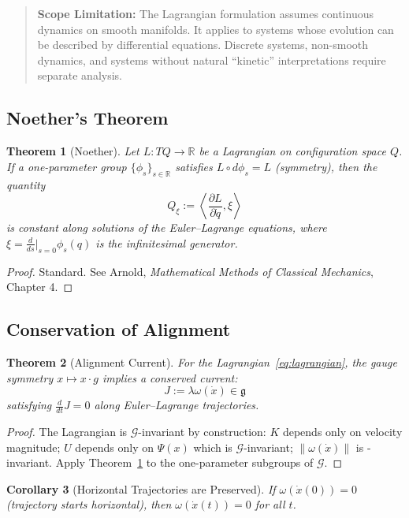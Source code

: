 \documentclass[12pt]{article}
\newtheorem{theorem}{Theorem}[section]
\newtheorem{corollary}[theorem]{Corollary}
\theoremstyle{definition}
\theoremstyle{remark}
\newcommand{\calG}{\mathcal{G}}
\newcommand{\fg}{\mathfrak{g}}
\begin{document}
\begin{quote}
\textbf{Scope Limitation:} The Lagrangian formulation assumes continuous dynamics on smooth
manifolds. It applies to systems whose evolution can be described by differential equations.
Discrete systems, non-smooth dynamics, and systems without natural ``kinetic'' interpretations require separate analysis.
\end{quote}

\subsection{Noether's Theorem}

\begin{theorem}[Noether]\label{thm:noether}
Let $L : TQ \to \mathbb{R}$ be a Lagrangian on configuration space $Q$. If a
one-parameter group $\{\phi_s\}_{s \in \mathbb{R}}$ satisfies $L \circ d\phi_s = L$ (symmetry), then the quantity
\[
    Q_\xi := \left\langle \frac{\partial L}{\partial \dot{q}}, \xi \right\rangle
\]
is constant along solutions of the Euler--Lagrange equations, where $\xi = \frac{d}{ds}\big|_{s=0} \phi_s(q)$ is the infinitesimal generator.
\end{theorem}

\begin{proof}
Standard. See Arnold, \emph{Mathematical Methods of Classical Mechanics}, Chapter 4.
\end{proof}

\subsection{Conservation of Alignment}

\begin{theorem}[Alignment Current]\label{thm:alignment}
For the Lagrangian~\eqref{eq:lagrangian}, the gauge symmetry $x \mapsto x \cdot g$
implies a conserved current:
\[
    J := \lambda\omega(\dot{x}) \in \fg
\]
satisfying $\frac{d}{dt}J = 0$ along Euler--Lagrange trajectories.
\end{theorem}

\begin{proof}
The Lagrangian is $\calG$-invariant by construction: $K$ depends only on velocity magnitude;
$U$ depends only on $\Psi(x)$ which is $\calG$-invariant; $\|\omega(\dot{x})\|$ is -invariant. Apply Theorem~\ref{thm:noether} to the
one-parameter subgroups of $\calG$.
\end{proof}

\begin{corollary}[Horizontal Trajectories are Preserved]\label{cor:horizontal}
If $\omega(\dot{x}(0)) = 0$ (trajectory starts horizontal), then $\omega(\dot{x}(t)) = 0$ for all $t$.
\end{corollary}
\end{document}
